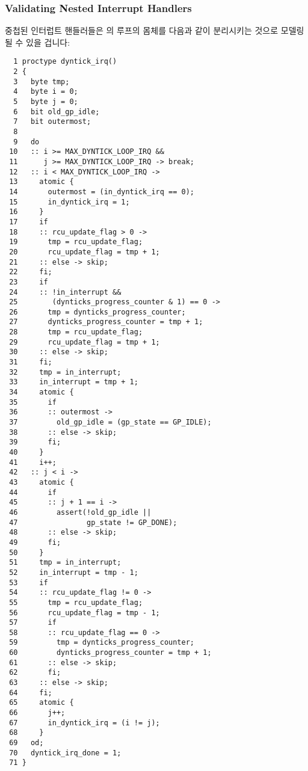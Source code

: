 \subsubsection{Validating Nested Interrupt Handlers}
\label{sec:formal:Validating Nested Interrupt Handlers}

중첩된 인터럽트 핸들러들은  의 루프의 몸체를 다음과 같이
분리시키는 것으로 모델링 될 수 있을 겁니다:
\iffalse

Nested interrupt handlers may be modeled by splitting the body of
the loop in \co{dyntick_irq()} as follows:
\fi

{ \scriptsize
\begin{verbatim}
  1 proctype dyntick_irq()
  2 {
  3   byte tmp;
  4   byte i = 0;
  5   byte j = 0;
  6   bit old_gp_idle;
  7   bit outermost;
  8
  9   do
 10   :: i >= MAX_DYNTICK_LOOP_IRQ &&
 11      j >= MAX_DYNTICK_LOOP_IRQ -> break;
 12   :: i < MAX_DYNTICK_LOOP_IRQ ->
 13     atomic {
 14       outermost = (in_dyntick_irq == 0);
 15       in_dyntick_irq = 1;
 16     }
 17     if
 18     :: rcu_update_flag > 0 ->
 19       tmp = rcu_update_flag;
 20       rcu_update_flag = tmp + 1;
 21     :: else -> skip;
 22     fi;
 23     if
 24     :: !in_interrupt &&
 25        (dynticks_progress_counter & 1) == 0 ->
 26       tmp = dynticks_progress_counter;
 27       dynticks_progress_counter = tmp + 1;
 28       tmp = rcu_update_flag;
 29       rcu_update_flag = tmp + 1;
 30     :: else -> skip;
 31     fi;
 32     tmp = in_interrupt;
 33     in_interrupt = tmp + 1;
 34     atomic {
 35       if
 36       :: outermost ->
 37         old_gp_idle = (gp_state == GP_IDLE);
 38       :: else -> skip;
 39       fi;
 40     }
 41     i++;
 42   :: j < i ->
 43     atomic {
 44       if
 45       :: j + 1 == i ->
 46         assert(!old_gp_idle ||
 47                gp_state != GP_DONE);
 48       :: else -> skip;
 49       fi;
 50     }
 51     tmp = in_interrupt;
 52     in_interrupt = tmp - 1;
 53     if
 54     :: rcu_update_flag != 0 ->
 55       tmp = rcu_update_flag;
 56       rcu_update_flag = tmp - 1;
 57       if
 58       :: rcu_update_flag == 0 ->
 59         tmp = dynticks_progress_counter;
 60         dynticks_progress_counter = tmp + 1;
 61       :: else -> skip;
 62       fi;
 63     :: else -> skip;
 64     fi;
 65     atomic {
 66       j++;
 67       in_dyntick_irq = (i != j);
 68     }
 69   od;
 70   dyntick_irq_done = 1;
 71 }
\end{verbatim}
}

